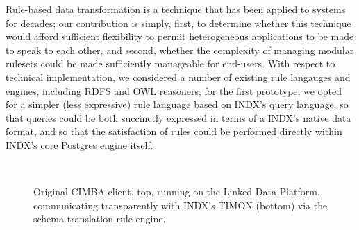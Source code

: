 \documentclass{sig-alternate}
\begin{document}
Rule-based data transformation is a technique that has been applied to systems for decades; our contribution is simply, first, to determine whether this technique would afford sufficient flexibility to permit heterogeneous applications to be made to speak to each other, and second, whether the complexity of managing modular rulesets could be made sufficiently manageable for end-users.   With respect to technical implementation, we considered a number of existing rule langauges and engines, including RDFS and OWL reasoners; for the first prototype, we opted for a simpler (less expressive) rule language based on INDX's query language, so that queries could be both succinctly expressed in terms of a INDX's native data format, and so that the satisfaction of rules could be performed directly within INDX's core Postgres engine itself.

\begin{figure}[t!]
 	  \begin{center}
        \\
    \end{center}
    \caption{%
        Original CIMBA client, top, running on the Linked Data Platform, communicating transparently with INDX's TIMON (bottom) via the schema-translation rule engine.
    }%
  \label{fig:timon}
\end{figure}
\end{document}
